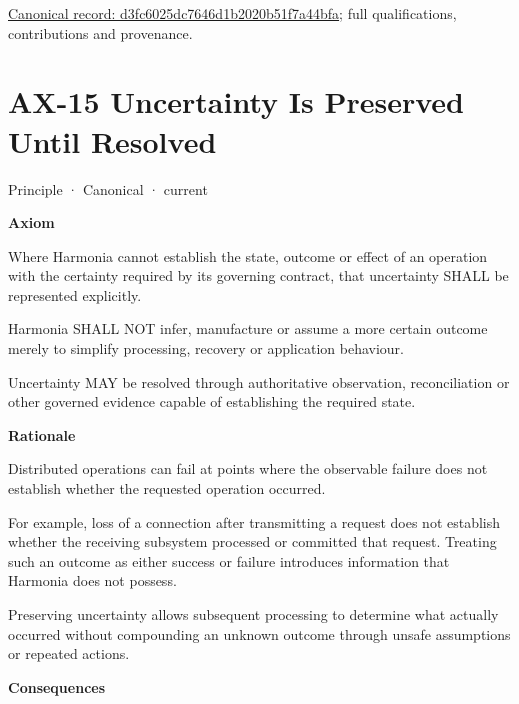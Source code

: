 {\footnotesize \href{../../../../continuum/motivation/principle/d3fc6025dc7646d1b2020b51f7a44bfa.md}{Canonical record: d3fc6025dc7646d1b2020b51f7a44bfa}; full qualifications, contributions and provenance.}\par
\section{AX-15 Uncertainty Is Preserved Until Resolved}

\label{element:ef8abbaec37e4890ad78b9f263e67906}
{\small Principle · Canonical · current}\par

\par\medskip\textbf{Axiom}\par


Where Harmonia cannot establish the state, outcome or effect of an operation with the certainty required by its governing contract, that uncertainty SHALL be represented explicitly.



Harmonia SHALL NOT infer, manufacture or assume a more certain outcome merely to simplify processing, recovery or application behaviour.



Uncertainty MAY be resolved through authoritative observation, reconciliation or other governed evidence capable of establishing the required state.



\par\medskip\textbf{Rationale}\par


Distributed operations can fail at points where the observable failure does not establish whether the requested operation occurred.



For example, loss of a connection after transmitting a request does not establish whether the receiving subsystem processed or committed that request. Treating such an outcome as either success or failure introduces information that Harmonia does not possess.



Preserving uncertainty allows subsequent processing to determine what actually occurred without compounding an unknown outcome through unsafe assumptions or repeated actions.



\par\medskip\textbf{Consequences}\par


